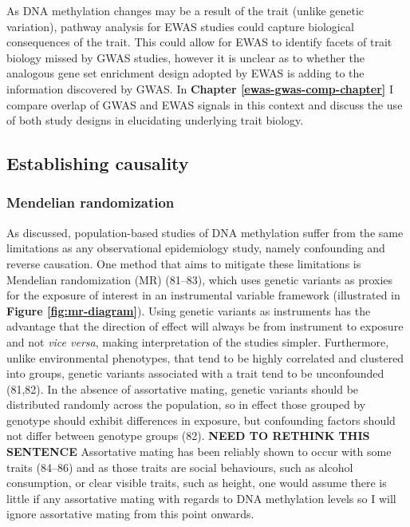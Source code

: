 \documentclass[11pt,twoside]{bristolthesis}
\begin{document}
As DNA methylation changes may be a result of the trait (unlike genetic variation), pathway analysis for EWAS studies could capture biological consequences of the trait. This could allow for EWAS to identify facets of trait biology missed by GWAS studies, however it is unclear as to whether the analogous gene set enrichment design adopted by EWAS is adding to the information discovered by GWAS. In \textbf{Chapter \ref{ewas-gwas-comp-chapter}} I compare overlap of GWAS and EWAS signals in this context and discuss the use of both study designs in elucidating underlying trait biology.

\hypertarget{establishing-causality}{%
\subsection{Establishing causality}\label{establishing-causality}}

\hypertarget{mendelian-randomization}{%
\subsubsection{Mendelian randomization}\label{mendelian-randomization}}

As discussed, population-based studies of DNA methylation suffer from the same limitations as any observational epidemiology study, namely confounding and reverse causation. One method that aims to mitigate these limitations is Mendelian randomization (MR) (81--83), which uses genetic variants as proxies for the exposure of interest in an instrumental variable framework (illustrated in \textbf{Figure \ref{fig:mr-diagram}}). Using genetic variants as instruments has the advantage that the direction of effect will always be from instrument to exposure and not \emph{vice versa}, making interpretation of the studies simpler. Furthermore, unlike environmental phenotypes, that tend to be highly correlated and clustered into groups, genetic variants associated with a trait tend to be unconfounded (81,82). In the absence of assortative mating, genetic variants should be distributed randomly across the population, so in effect those grouped by genotype should exhibit differences in exposure, but confounding factors should not differ between genotype groups (82). \textbf{NEED TO RETHINK THIS SENTENCE} Assortative mating has been reliably shown to occur with some traits (84--86) and as those traits are social behaviours, such as alcohol consumption, or clear visible traits, such as height, one would assume there is little if any assortative mating with regards to DNA methylation levels so I will ignore assortative mating from this point onwards.
\end{document}
